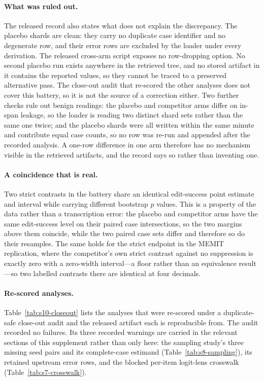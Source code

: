 \documentclass[letterpaper]{article}
\begin{document}
\paragraph{What was ruled out.}
The released record also states what does not explain the discrepancy.  The
placebo shards are clean: they carry no duplicate case identifier and no
degenerate row, and their error rows are excluded by the loader under every
derivation.  The released cross-arm script exposes no row-dropping option.  No
second placebo run exists anywhere in the retrieved tree, and no stored artifact
in it contains the reported values, so they cannot be traced to a preserved
alternative pass.  The close-out audit that re-scored the other analyses does not
cover this battery, so it is not the source of a correction either.  Two further
checks rule out benign readings: the placebo and competitor arms differ on
in-span leakage, so the loader is reading two distinct shard sets rather than the
same one twice; and the placebo shards were all written within the same minute
and contribute equal case counts, so no row was re-run and appended after the
recorded analysis.  A one-row difference in one arm therefore has no mechanism
visible in the retrieved artifacts, and the record says so rather than inventing
one.

\paragraph{A coincidence that is real.}
Two strict contrasts in the battery share an identical edit-success point
estimate and interval while carrying different bootstrap \(p\) values.  This is a
property of the data rather than a transcription error: the placebo and
competitor arms have the same edit-success level on their paired case
intersections, so the two margins above them coincide, while the two paired case
sets differ and therefore so do their resamples.  The same holds for the strict
endpoint in the MEMIT replication, where the competitor's own strict contrast
against no suppression is exactly zero with a zero-width interval---a floor
rather than an equivalence result---so two labelled contrasts there are identical
at four decimals.

\paragraph{Re-scored analyses.}
Table~\ref{tab:s10-closeout} lists the analyses that were re-scored under a
duplicate-safe close-out audit and the released artifact each is reproducible
from.  The audit recorded no failures.  Its three recorded warnings are carried
in the relevant sections of this supplement rather than only here: the sampling
study's three missing seed pairs and its complete-case estimand
(Table~\ref{tab:s8-sampling}), its retained upstream error rows, and the blocked
per-item logit-lens crosswalk (Table~\ref{tab:s7-crosswalk}).
\end{document}
